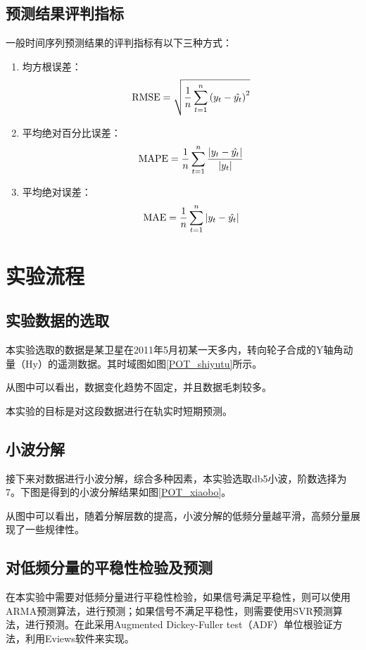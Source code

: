\subsection{预测结果评判指标}
一般时间序列预测结果的评判指标有以下三种方式：
\begin{enumerate}[label=（\arabic*）]
	\item 均方根误差：
	\begin{equation}
		\mathrm{RMSE} = \sqrt{{1\over n} \sum_{t=1}^{n}{(y_t-\hat{y_t})}^2}
	\end{equation}
	\item 平均绝对百分比误差：
	\begin{equation}
		\mathrm{MAPE} = {1\over n} \sum_{t=1}^{n}{\left| y_t-\hat{y_t} \right|  \over \left| y_t \right|  }
	\end{equation}
	\item 平均绝对误差：
	\begin{equation}
		\mathrm{MAE} = {1\over n} \sum_{t=1}^{n}{\left| y_t-\hat{y_t} \right|  }
	\end{equation}
\end{enumerate}

\section{实验流程}
\subsection{实验数据的选取}
本实验选取的数据是某卫星在2011年5月初某一天多内，转向轮子合成的Y轴角动量（Hy）的遥测数据。其时域图如图\ref{POT_shiyutu}所示。

从图中可以看出，数据变化趋势不固定，并且数据毛刺较多。

本实验的目标是对这段数据进行在轨实时短期预测。

\subsection{小波分解}
接下来对数据进行小波分解，综合多种因素，本实验选取db5小波，阶数选择为7。下图是得到的小波分解结果如图\ref{POT_xiaobo}。

从图中可以看出，随着分解层数的提高，小波分解的低频分量越平滑，高频分量展现了一些规律性。

\subsection{对低频分量的平稳性检验及预测}
在本实验中需要对低频分量进行平稳性检验，如果信号满足平稳性，则可以使用ARMA预测算法，进行预测；如果信号不满足平稳性，则需要使用SVR预测算法，进行预测。在此采用Augmented Dickey-Fuller test（ADF）单位根验证方法，利用Eviews软件来实现。

